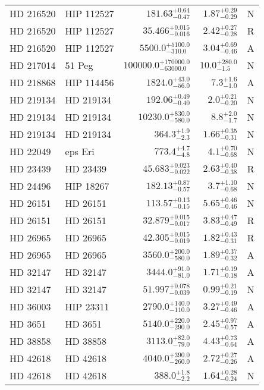 \begin{longtable*}{llrrr}
HD 216520 & HIP 112527 & $181.63^{+0.64}_{-0.47}$ & $1.87^{+0.29}_{-0.29}$ & N \\
HD 216520 & HIP 112527 & $35.466^{+0.015}_{-0.016}$ & $2.42^{+0.27}_{-0.28}$ & R \\
HD 216520 & HIP 112527 & $5500.0^{+5100.0}_{-310.0}$ & $3.04^{+0.69}_{-0.46}$ & A \\
HD 217014 & 51 Peg & $100000.0^{+170000.0}_{-63000.0}$ & $10.0^{+280.0}_{-1.5}$ & N \\
HD 218868 & HIP 114456 & $1824.0^{+43.0}_{-56.0}$ & $7.3^{+1.6}_{-1.0}$ & A \\
HD 219134 & HD 219134 & $192.06^{+0.49}_{-0.40}$ & $2.0^{+0.21}_{-0.20}$ & N \\
HD 219134 & HD 219134 & $10230.0^{+830.0}_{-580.0}$ & $8.8^{+2.0}_{-1.7}$ & N \\
HD 219134 & HD 219134 & $364.3^{+1.9}_{-2.3}$ & $1.66^{+0.35}_{-0.31}$ & N \\
HD 22049 & eps Eri & $773.4^{+4.7}_{-4.8}$ & $4.1^{+0.70}_{-0.68}$ & N \\
HD 23439 & HD 23439 & $45.683^{+0.023}_{-0.022}$ & $2.63^{+0.40}_{-0.38}$ & R \\
HD 24496 & HIP 18267 & $182.13^{+0.87}_{-0.57}$ & $3.7^{+1.10}_{-0.68}$ & N \\
HD 26151 & HD 26151 & $113.57^{+0.13}_{-0.15}$ & $5.65^{+0.46}_{-0.46}$ & N \\
HD 26151 & HD 26151 & $32.879^{+0.015}_{-0.017}$ & $3.83^{+0.47}_{-0.49}$ & R \\
HD 26965 & HD 26965 & $42.305^{+0.015}_{-0.019}$ & $1.82^{+0.43}_{-0.31}$ & R \\
HD 26965 & HD 26965 & $3560.0^{+200.0}_{-580.0}$ & $1.89^{+0.37}_{-0.32}$ & A \\
HD 32147 & HD 32147 & $3444.0^{+91.0}_{-81.0}$ & $1.71^{+0.19}_{-0.18}$ & A \\
HD 32147 & HD 32147 & $51.997^{+0.078}_{-0.039}$ & $0.99^{+0.21}_{-0.19}$ & N \\
HD 36003 & HIP 23311 & $2790.0^{+140.0}_{-110.0}$ & $3.27^{+0.49}_{-0.46}$ & A \\
HD 3651 & HD 3651 & $5140.0^{+220.0}_{-290.0}$ & $2.45^{+0.97}_{-0.57}$ & A \\
HD 38858 & HD 38858 & $3113.0^{+82.0}_{-79.0}$ & $4.43^{+0.73}_{-0.64}$ & A \\
HD 42618 & HD 42618 & $4040.0^{+390.0}_{-260.0}$ & $2.72^{+0.27}_{-0.26}$ & A \\ 
HD 42618 & HD 42618 & $388.0^{+1.8}_{-2.2}$ & $1.64^{+0.28}_{-0.24}$ & N \\

\end{longtable*}
